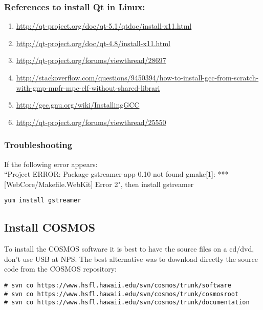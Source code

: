 \documentclass{article}
\begin{document}
\subsubsection{References to install Qt in Linux: }

\begin{enumerate}
\item \url{http://qt-project.org/doc/qt-5.1/qtdoc/install-x11.html}
\item \url{http://qt-project.org/doc/qt-4.8/install-x11.html}
\item \url{http://qt-project.org/forums/viewthread/28697}
\item \url{http://stackoverflow.com/questions/9450394/how-to-install-gcc-from-scratch-with-gmp-mpfr-mpc-elf-without-shared-librari}
\item \url{http://gcc.gnu.org/wiki/InstallingGCC}
\item \url{http://qt-project.org/forums/viewthread/25550}
\end{enumerate}


\subsubsection{Troubleshooting}
If the following error appears: \\
``Project ERROR: Package gstreamer-app-0.10 not found
gmake[1]: *** [WebCore/Makefile.WebKit] Error 2", then install gstreamer
\begin{lstlisting}[style=BashInputStyle]
yum install gstreamer
\end{lstlisting}









\subsection{Install COSMOS}

To install the COSMOS software it is best to have the source files on a cd/dvd, don't use USB at NPS. The best alternative was to download directly the source code from the COSMOS repository:

\begin{lstlisting}[style=BashInputStyle]
# svn co https://www.hsfl.hawaii.edu/svn/cosmos/trunk/software
# svn co https://www.hsfl.hawaii.edu/svn/cosmos/trunk/cosmosroot
# svn co https://www.hsfl.hawaii.edu/svn/cosmos/trunk/documentation
\end{lstlisting}
\end{document}
